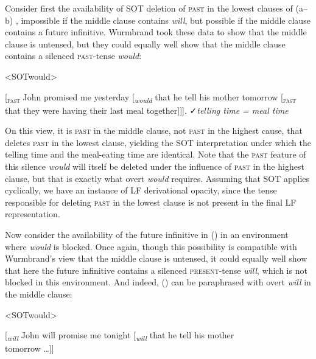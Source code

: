 \documentclass[output=paper]{langscibook}
\begin{document}
Consider first the availability of SOT deletion of \textsc{past} in the lowest clauses of (a--b) , impossible if the middle clause contains \textit{will}, but possible if the middle clause contains a future infinitive. Wurmbrand took these data to show that the middle clause is untensed, but they could equally well show that the middle clause contains a silenced \textsc{past}-tense \textit{would}:

\pex<SOTwould>

{[}\textsubscript{\textsc{past}} John promised me yesterday {[}\textsubscript{\textit{would}} that he  tell his mother tomorrow {[}\textsubscript{\textsc{past}} that they were having their last meal together{]]]}. \smallbreak
✓\textit{telling time = meal time}
\xe

On this view, it is \textsc{past} in the middle clause, not \textsc{past} in the highest cause, that deletes \textsc{past} in the lowest clause, yielding the SOT interpretation under which the telling time and the meal-eating time are identical. Note that the \textsc{past} feature of this silence \textit{would} will itself be deleted under the influence of \textsc{past} in the highest clause, but that is exactly what overt \textit{would} requires. Assuming that SOT applies cyclically, we have an instance of LF derivational opacity, since the tense responsible for deleting \textsc{past} in the lowest clause is not present in the final LF representation. 

Now consider the availability of the future infinitive in () in an environment where \textit{would} is blocked. Once again, though this possibility is compatible with Wurmbrand's view that the middle clause is untensed, it could equally well show that here the future infinitive contains a silenced \textsc{present-}tense \textit{will}, which is not blocked in this environment. And indeed, () can be paraphrased with overt \textit{will} in the middle clause:\largerpage[1.75]

\pex[belowexskip=0pt,aboveexskip=.5\baselineskip]<SOTwould>

{[}\textsubscript{\textit{will}} John will promise me tonight {[}\textsubscript{\textit{will}} that he  tell his mother \\tomorrow \ldots{]]}
\xe
\end{document}

